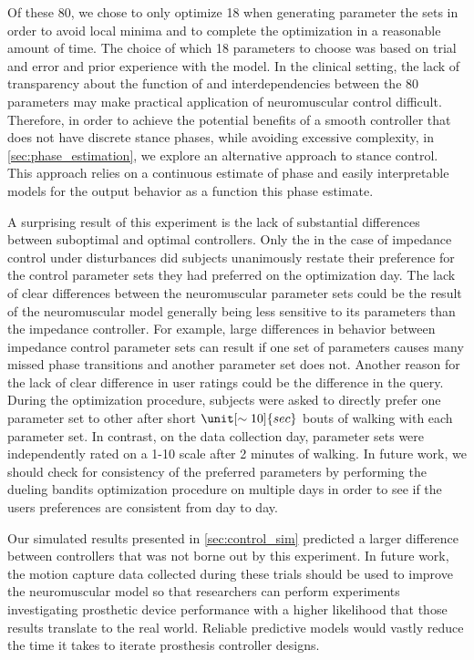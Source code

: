 Of these 80, we chose to only optimize 18 when generating parameter the sets in
order to avoid local minima and to complete the optimization in a reasonable
amount of time. The choice of which 18 parameters to choose was based on trial
and error and prior experience with the model. In the clinical setting, the lack
of transparency about the function of and interdependencies between the 80
parameters may make practical application of neuromuscular control difficult.
Therefore, in order to achieve the potential benefits of a smooth controller
that does not have discrete stance phases, while avoiding excessive complexity,
in \cref{sec:phase_estimation}, we explore an alternative approach to stance
control. This approach relies on a continuous estimate of phase and easily
interpretable models for the output behavior as a function this phase estimate.

A surprising result of this experiment is the lack of substantial differences
between suboptimal and optimal controllers. Only the in the case of impedance
control under disturbances did subjects unanimously restate their preference for
the control parameter sets they had preferred on the optimization day. The lack
of clear differences between the neuromuscular parameter sets could be the
result of the neuromuscular model generally being less sensitive to its
parameters than the impedance controller. For example, large differences in
behavior between impedance control parameter sets can result if one set of
parameters causes many missed phase transitions and another parameter set does
not. Another reason for the lack of clear difference in user ratings could be
the difference in the query. During the optimization procedure, subjects were
asked to directly prefer one parameter set to other after short
$\unit[\sim10]{sec}$ bouts of walking with each parameter set. In contrast, on
the data collection day, parameter sets were independently rated on a 1-10 scale
after 2 minutes of walking. In future work, we should check for consistency of
the preferred parameters by performing the dueling bandits optimization
procedure on multiple days in order to see if the users preferences are
consistent from day to day.

Our simulated results presented in \cref{sec:control_sim} predicted a larger
difference between controllers that was not borne out by this experiment.  In
future work, the motion capture data collected during these trials should be
used to improve the neuromuscular model so that researchers can perform
experiments investigating prosthetic device performance with a higher likelihood
that those results translate to the real world. Reliable predictive models would
vastly reduce the time it takes to iterate prosthesis controller designs.

